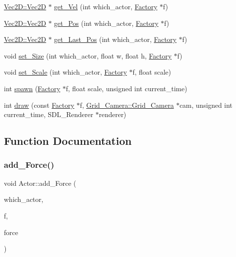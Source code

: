 \begin{DoxyCompactItemize}
\item 
\mbox{\hyperlink{struct_vec2_d_1_1_vec2_d}{Vec2\+D\+::\+Vec2D}} $\ast$ \mbox{\hyperlink{namespace_actor_ab6c8bbeea8014b7b90d8902527961e2d}{get\+\_\+\+Vel}} (int which\+\_\+actor, \mbox{\hyperlink{struct_actor_1_1_factory}{Factory}} $\ast$f)
\item 
\mbox{\hyperlink{struct_vec2_d_1_1_vec2_d}{Vec2\+D\+::\+Vec2D}} $\ast$ \mbox{\hyperlink{namespace_actor_a7594fa0d4d2edd3dd8a2f5aeebe70f97}{get\+\_\+\+Pos}} (int which\+\_\+actor, \mbox{\hyperlink{struct_actor_1_1_factory}{Factory}} $\ast$f)
\item 
\mbox{\hyperlink{struct_vec2_d_1_1_vec2_d}{Vec2\+D\+::\+Vec2D}} $\ast$ \mbox{\hyperlink{namespace_actor_a3b1e7a688fd053cc585b45fcfac99e8e}{get\+\_\+\+Last\+\_\+\+Pos}} (int which\+\_\+actor, \mbox{\hyperlink{struct_actor_1_1_factory}{Factory}} $\ast$f)
\item 
void \mbox{\hyperlink{namespace_actor_a4a9e57d332e039598f1acfb74da419a5}{set\+\_\+\+Size}} (int which\+\_\+actor, float w, float h, \mbox{\hyperlink{struct_actor_1_1_factory}{Factory}} $\ast$f)
\item 
void \mbox{\hyperlink{namespace_actor_a9a863bda46c95e2330f6c0d6e4a3cc42}{set\+\_\+\+Scale}} (int which\+\_\+actor, \mbox{\hyperlink{struct_actor_1_1_factory}{Factory}} $\ast$f, float scale)
\item 
int \mbox{\hyperlink{namespace_actor_ab5468479b7705db60362fb26340d0c7b}{spawn}} (\mbox{\hyperlink{struct_actor_1_1_factory}{Factory}} $\ast$f, float scale, unsigned int current\+\_\+time)
\item 
int \mbox{\hyperlink{namespace_actor_a5e098b8721cbebeb27de076a98107368}{draw}} (const \mbox{\hyperlink{struct_actor_1_1_factory}{Factory}} $\ast$f, \mbox{\hyperlink{struct_grid___camera_1_1_grid___camera}{Grid\+\_\+\+Camera\+::\+Grid\+\_\+\+Camera}} $\ast$cam, unsigned int current\+\_\+time, S\+D\+L\+\_\+\+Renderer $\ast$renderer)
\end{DoxyCompactItemize}


\subsection{Function Documentation}
\mbox{\label{namespace_actor_aa499e89c5134fa9a58be884101247d60}} 
\subsubsection{\texorpdfstring{add\+\_\+\+Force()}{add\_Force()}}
{\footnotesize\ttfamily void Actor\+::add\+\_\+\+Force (\begin{DoxyParamCaption}\item[{int}]{which\+\_\+actor,  }\item[{\mbox{\hyperlink{struct_actor_1_1_factory}{Factory}} $\ast$}]{f,  }\item[{\mbox{\hyperlink{struct_vec2_d_1_1_vec2_d}{Vec2\+D\+::\+Vec2D}} $\ast$}]{force }\end{DoxyParamCaption})}

